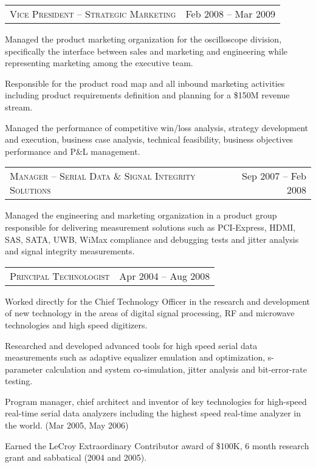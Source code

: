 \documentclass[10pt,letterpaper]{extarticle}
\makeatletter
\newcommand{\headerrow}[2]
{\begin{tabular*}{\linewidth}{l@{\extracolsep{\fill}}r}
	#1 &
	#2 \\
\end{tabular*}}
\makeatother
\begin{document}
	\headerrow
	{\large \textsc{Vice President – Strategic Marketing}}
	{Feb 2008 – Mar 2009}\vspace{-\topsep}\begin{itemize*}
		\item Managed the product marketing organization for the oscilloscope division, 
		specifically the interface between sales and marketing  and engineering 
		while representing  marketing among the executive team.
		\item Responsible for the product road map and all inbound marketing activities 
		including product requirements definition and planning for a \$150M revenue stream.
		\item Managed the performance of competitive win/loss analysis, strategy development 
		and execution, business case analysis, technical feasibility, business objectives 
		performance and P\&L management.
	\end{itemize*}\vspace{-\topsep}
	\headerrow
	{\large \textsc{Manager – Serial Data \& Signal Integrity Solutions}}
	{Sep 2007 – Feb 2008}\vspace{-\topsep}\begin{itemize*}
	\item Managed the engineering and marketing organization in a product group responsible 
	for delivering measurement solutions such as PCI-Express, HDMI, SAS, SATA, UWB, WiMax 
	compliance and debugging tests and jitter analysis and signal integrity measurements.
	\end{itemize*}\vspace{-\topsep}
	\headerrow
	{\large \textsc{Principal  Technologist}}
	{Apr 2004 – Aug 2008}\vspace{-\topsep}\begin{itemize*}
	\item Worked directly for the Chief Technology Officer in the research and development
	of new technology in the areas of digital signal processing, RF and microwave
	 technologies and high speed digitizers.
	\item Researched and developed advanced tools for high speed serial data measurements
	 such as adaptive equalizer emulation and optimization, s-parameter calculation and
	 system co-simulation, jitter analysis and bit-error-rate testing.
	\item Program manager, chief architect and inventor of key technologies for high-speed
	real-time serial data analyzers including the highest speed real-time analyzer in the
	world. (Mar 2005,  May 2006)
	\item Earned the LeCroy Extraordinary Contributor award of \$100K, 6 month research grant and sabbatical (2004 and 2005).
	\end{itemize*}\vspace{-\topsep}
\end{document}
